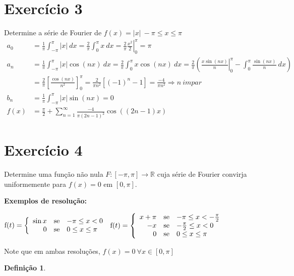 \documentclass[12pt,openany, letterpaper]{book}
\newtheorem{definition}{Definição}[section]
\newcommand{\soma}[2][n]{\sum_{{#1} = #2}^\infty}
\newcommand{\E}[1]{Exercício #1}
\newcommand{\IP}{\int_{-\pi}^{\pi}}
\begin{document}
{{\section*{\E 3} Determine a série de Fourier de $f(x) = |x|\ -\pi \leq x \leq \pi$ \begin{align*}
    a_0 &= \frac{1}{\pi} \IP |x| \ dx = \frac{2}{\pi} \int_0^\pi x \ dx = \left.\frac{2}{\pi}\frac{x^2}{2}\right|_0^\pi = \pi \\
    a_n &= \frac{1}{\pi} \IP |x| \cos (nx) \ dx = \frac{2}{\pi} \int_0^\pi x \cos (nx) \ dx = \frac{2}{\pi} \left(\left.\frac{x \sin (nx)}{n}\right|_0^\pi - \int_0^\pi \frac{\sin (nx) }{n} \ dx\right)\\
    &= \frac{2}{\pi}\left[\frac{\cos (nx)}{n^2}\right]_0^\pi = \frac{2}{\pi n^2}[(-1)^n - 1] = \frac{-4}{\pi n^2} \Rightarrow n \ impar\\
    b_n &= \frac{1}{\pi} \IP |x| \sin (nx) = 0 \\
    f(x) &= \frac{\pi}{2} + \soma{1} \frac{-4}{\pi (2n-1)^2}\cos ((2n-1)x)
\end{align*}

\section*{\E 4} Determine uma função não nula $F:[-\pi,\pi] \rightarrow \mathds{R}$ cuja série de Fourier convirja uniformemente para $f(x) = 0$ em $[0,\pi]$.

\textbf{Exemplos de resolução:}

$\hbox{f}(t)
= \left\{ \begin{array}{rll}
\sin x & \hbox{se} &  -\pi \leq x < 0 \\
0 & \hbox{se} & 0 \leq x \leq \pi \\
\end{array}\right.$
\vspace {5mm}
$\hbox{f}(t)
= \left\{ \begin{array}{rll}
x + \pi & \hbox{se} &  -\pi \leq x < -\frac{\pi}{2} \\
-x & \hbox{se} & -\frac{\pi}{2} \leq x < 0 \\
0 & \hbox{se} & 0 \leq x \leq \pi \\
\end{array}\right.$

Note que em ambas resoluções, $f(x) = 0 \ \forall x \in [0,\pi]$

\begin{framed}
\begin{definition}
\end{definition}
\end{framed}

}}
\end{document}
